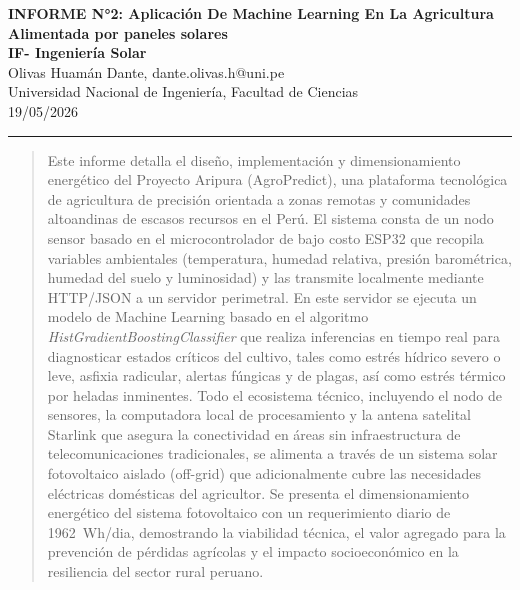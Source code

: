 \documentclass[a4paper, 11pt]{article}
\begin{document}
\begin{center}
    \huge{\textbf{INFORME N°2: Aplicación De Machine Learning En La Agricultura Alimentada por paneles solares}}\\
    \vspace{3mm} 
    \large \textbf{IF- Ingeniería Solar} \\
    \vspace{1mm}
    Olivas Huamán Dante, dante.olivas.h@uni.pe \\
              
    \vspace{1mm}
    Universidad Nacional de Ingeniería, Facultad de Ciencias \\
    \vspace{1mm}
    19/05/2026
\end{center}

\vspace{2mm}

\hrule height 1.2pt 
\vspace{1mm}

\begin{abstract}
Este informe detalla el diseño, implementación y dimensionamiento energético del Proyecto Aripura (AgroPredict), una plataforma tecnológica de agricultura de precisión orientada a zonas remotas y comunidades altoandinas de escasos recursos en el Perú. El sistema consta de un nodo sensor basado en el microcontrolador de bajo costo ESP32 que recopila variables ambientales (temperatura, humedad relativa, presión barométrica, humedad del suelo y luminosidad) y las transmite localmente mediante HTTP/JSON a un servidor perimetral. En este servidor se ejecuta un modelo de Machine Learning basado en el algoritmo \textit{HistGradientBoostingClassifier} que realiza inferencias en tiempo real para diagnosticar estados críticos del cultivo, tales como estrés hídrico severo o leve, asfixia radicular, alertas fúngicas y de plagas, así como estrés térmico por heladas inminentes. Todo el ecosistema técnico, incluyendo el nodo de sensores, la computadora local de procesamiento y la antena satelital Starlink que asegura la conectividad en áreas sin infraestructura de telecomunicaciones tradicionales, se alimenta a través de un sistema solar fotovoltaico aislado (off-grid) que adicionalmente cubre las necesidades eléctricas domésticas del agricultor. Se presenta el dimensionamiento energético del sistema fotovoltaico con un requerimiento diario de \SI{1962}{Wh/dia}, demostrando la viabilidad técnica, el valor agregado para la prevención de pérdidas agrícolas y el impacto socioeconómico en la resiliencia del sector rural peruano.
\end{abstract}
\vspace{2mm}
\end{document}
